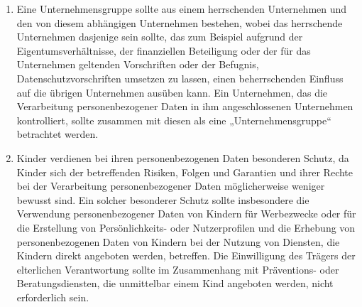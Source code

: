 \begin{enumerate}

   \item Eine Unternehmensgruppe sollte aus einem herrschenden Unternehmen und den von diesem abhängigen Unternehmen
    bestehen, wobei das herrschende Unternehmen dasjenige sein sollte, das zum Beispiel aufgrund der
    Eigentumsverhältnisse, der finanziellen Beteiligung oder der für das Unternehmen geltenden Vorschriften oder der
    Befugnis, Datenschutzvorschriften umsetzen zu lassen, einen beherrschenden Einfluss auf die übrigen Unternehmen
    ausüben kann. Ein Unternehmen, das die Verarbeitung personenbezogener Daten in ihm angeschlossenen Unternehmen
    kontrolliert, sollte zusammen mit diesen als eine „Unternehmensgruppe“ betrachtet werden.%
   \label{itm:eg-37}
   

   \item Kinder verdienen bei ihren personenbezogenen Daten besonderen Schutz, da Kinder sich der betreffenden Risiken,
    Folgen und Garantien und ihrer Rechte bei der Verarbeitung personenbezogener Daten möglicherweise weniger bewusst
    sind. Ein solcher besonderer Schutz sollte insbesondere die Verwendung personenbezogener Daten von Kindern für
    Werbezwecke oder für die Erstellung von Persönlichkeits- oder Nutzerprofilen und die Erhebung von personenbezogenen
    Daten von Kindern bei der Nutzung von Diensten, die Kindern direkt angeboten werden, betreffen. Die Einwilligung
    des Trägers der elterlichen Verantwortung sollte im Zusammenhang mit Präventions- oder Beratungsdiensten, die
    unmittelbar einem Kind angeboten werden, nicht erforderlich sein.%
   \label{itm:eg-38}
   


\end{enumerate}
